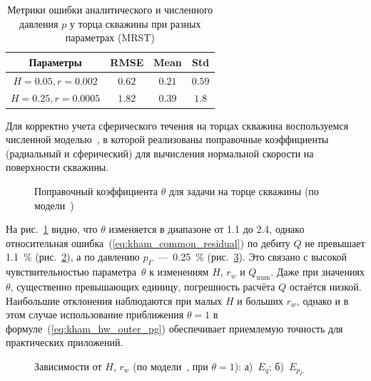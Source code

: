 \documentclass{article}
\begin{document}
\begin{table}[H]
	\centering
	\caption{
		Метрики ошибки аналитического и численного давления $p$ у торца скважины
		при разных параметрах (MRST)
	}
	\label{tab:kham_hw_outer_p_error_metrics_mrst}
	\begin{tabular}{|c|c|c|c|} %
		\hline %
		\textbf{Параметры} & \textbf{RMSE} & \textbf{Mean} & \textbf{Std} \\
		\hline %
		$H=0.05, r=0.002$  & $0.62$        & $0.21$        & $0.59$       \\
		\hline %
		$H=0.25, r=0.0005$ & $1.82$        & $0.39$        & $1.8$        \\
		\hline %
	\end{tabular}
\end{table}

Для корректно учета сферического течения на торцах скважина воспользуемся
численной моделью~\cite{lit:kham_mazo_uzku_2015}, в которой реализованы
поправочные коэффициенты (радиальный и сферический) для вычисления нормальной
скорости на поверхности скважины.

\begin{figure}[H]
	\centering
	
	\caption{Поправочный коэффициента $\theta$ для задачи на торце скважины (по модели~\cite{lit:kham_mazo_uzku_2015})}
	\label{fig:kham_hw_outer_theta_map_mgrp}
\end{figure}

На рис.~\ref{fig:kham_hw_outer_theta_map_mgrp} видно, что $\theta$ изменяется в диапазоне от 1.1 до 2.4,
однако относительная ошибка~(\ref{eq:kham_common_residual}) по дебиту $Q$ не превышает 1.1~\%
(рис.~\ref{fig:kham_hw_outer_eq_map_mgrp}), а по давлению $p_{\Gamma}$~---~0.25~\%
(рис.~\ref{fig:kham_hw_outer_epg_map_mgrp}). Это связано с высокой чувствительностью параметра~$\theta$
к изменениям $H$, $r_w$ и $Q_{\text{num}}$. Даже при значениях $\theta$, существенно превышающих единицу,
погрешность расчёта $Q$ остаётся низкой. Наибольшие отклонения наблюдаются при малых $H$ и больших $r_w$,
однако и в этом случае использование приближения $\theta=1$ в формуле~(\ref{eq:kham_hw_outer_pg})
обеспечивает приемлемую точность для практических приложений.


\begin{figure}[H]
	\centering
	\begin{subfigure}{0.48\textwidth}
		\centering
		
		\caption{}
		\label{fig:kham_hw_outer_eq_map_mgrp}
	\end{subfigure}
	\hfill
	\begin{subfigure}{0.48\textwidth}
		\centering
		
		\caption{}
		\label{fig:kham_hw_outer_epg_map_mgrp}
	\end{subfigure}
	\caption{
		Зависимости от $H$, $r_w$ (по модели~\cite{lit:kham_mazo_uzku_2015}, при $\theta = 1$):
		а)~$E_q$;
		б)~$E_{p_{\Gamma}}$
	}
	\label{fig:kham_hw_outer_theta_epg_maps_mgrp}
\end{figure}
\end{document}
